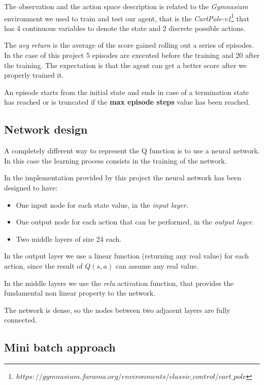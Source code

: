 \documentclass{article}
\begin{document}
The observation and the action space description is related to the \emph{Gymnasium} environment we used to train and test our agent, 
that is the \emph{CartPole-v1}\footnote{$https://gymnasium.farama.org/environments/classic\_control/cart\_pole$} that has 4 
continuous variables to denote the state and 2 discrete possible actions.

The \emph{avg return} is the average of the score gained rolling out a series of episodes.
In the case of this project 5 episodes are executed before the training and 20 after the training.
The expectation is that the agent can get a better score after we properly trained it.

An episode starts from the initial state and ends in case of a termination state has reached or is truncated if 
the \textbf{max episode steps} value has been reached.

\subsection{Network design}

A completely different way to represent the Q function is to use a neural network.
In this case the learning process consists in the training of the network.

In the implementation provided by this project the neural network has been designed to have:
\begin{itemize}
  \item One input node for each state value, in the \emph{input layer}.
  \item One output node for each action that can be performed, in the \emph{output layer}.
  \item Two middle layers of size 24 each.
\end{itemize}

In the output layer we use a linear function (returning any real value) for each action,
since the result of $Q(s,a)$ can assume any real value.

In the middle layers we use the \emph{relu} activation function, that provides the fundamental 
non linear property to the network.

The network is dense, so the nodes between two adjacent layers are fully connected.

\subsection{Mini batch approach}
\end{document}
